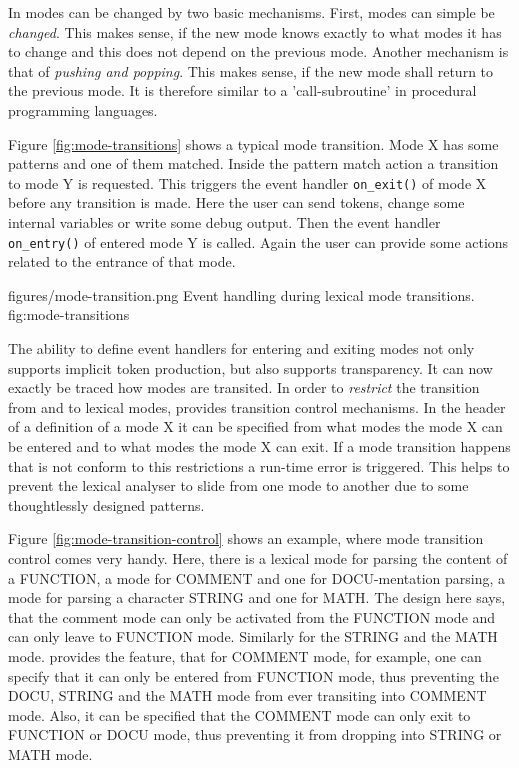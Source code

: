 In {\Quex} modes can be changed by two basic mechanisms. First, modes can
simple be {\it changed}. This makes sense, if the new mode knows exactly to what
modes it has to change and this does not depend on the previous mode. Another
mechanism is that of {\it pushing and popping}. This makes sense, if the new
mode shall return to the previous mode. It is therefore similar to a
'call-subroutine' in procedural programming languages. 

Figure \ref{fig:mode-transitions} shows a typical mode transition. Mode X has some patterns
and one of them matched. Inside the pattern match action a transition to mode
Y is requested. This triggers the event handler {\tt on\_exit()} of mode X
before any transition is made. Here the user can send tokens, change some
internal variables or write some debug output. Then 
the event handler {\tt on\_entry()} of entered mode Y is called. Again the user
can provide some actions related to the entrance of that mode.

\showpic
{figures/mode-transition.png}
{Event handling during lexical mode transitions.}
{fig:mode-transitions}

The ability to define event handlers for entering and exiting modes not only
supports implicit token production, but also supports transparency. It can now
exactly be traced how modes are transited. In order to {\it restrict} the
transition from and to lexical modes, {\quex} provides transition control
mechanisms. In the header of a definition of a mode X it can be specified from
what modes the mode X can be entered and to what modes the mode X can exit.
If a mode transition happens that is not conform to this restrictions a
run-time error is triggered. This helps to prevent the lexical analyser to
slide from one mode to another due to some thoughtlessly designed patterns.

Figure \ref{fig:mode-transition-control} shows an example, where mode
transition control comes very handy. Here, there is a lexical mode for parsing
the content of a {\sf FUNCTION}, a mode for {\sf COMMENT} and one for {\sf
  DOCU}-mentation parsing, a mode for parsing a character {\sf STRING} and one
for {\sf MATH}. The design here says, that the comment mode can only be
activated from the {\sf FUNCTION} mode and can only leave to {\sf FUNCTION}
mode. Similarly for the {\sf STRING} and the {\sf MATH} mode. {\Quex} provides
the feature, that for {\sf COMMENT} mode, for example, one can specify that it
can only be entered from {\sf FUNCTION} mode, thus preventing the {\sf DOCU},
{\sf STRING} and the {\sf MATH} mode from ever transiting into {\sf COMMENT}
mode. Also, it can be specified that the {\sf COMMENT} mode can only exit to
{\sf FUNCTION} or {\sf DOCU} mode, thus preventing it from dropping into {\sf
  STRING} or {\sf MATH} mode.

